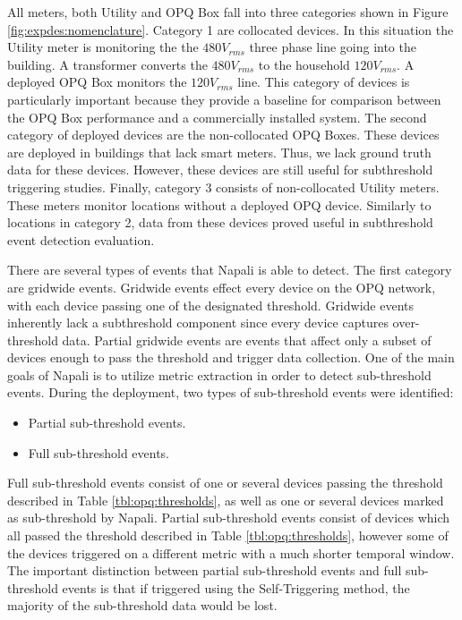 All meters, both Utility and OPQ Box fall into three categories shown in Figure \ref{fig:expdes:nomenclature}.
Category 1 are collocated devices.
In this situation the Utility meter is monitoring the the $480V_{rms}$ three phase line going into the building.
A transformer converts the $480V_{rms}$ to the household $120V_{rms}$.
A deployed OPQ Box monitors the $120V_{rms}$ line.
This category of devices is particularly important because they provide a baseline for comparison between the OPQ Box performance and a commercially installed system.
The second category of deployed devices are the non-collocated OPQ Boxes.
These devices are deployed in buildings that lack smart meters.
Thus, we lack ground truth data for these devices.
However, these devices are still useful for subthreshold triggering studies.
Finally, category 3 consists of non-collocated Utility meters.
These meters monitor locations without a deployed OPQ device.
Similarly to locations in category 2, data from these devices proved useful in subthreshold event detection evaluation.

There are several types of events that Napali is able to detect.
The first category are gridwide events.
Gridwide events effect every device on the OPQ network, with each device passing one of the designated threshold.
Gridwide events inherently lack a subthreshold component since every device captures over-threshold data.
Partial gridwide events are events that affect only a subset of devices enough to pass the threshold and trigger data collection.
One of the main goals of Napali is to utilize metric extraction in order to detect sub-threshold events.
During the deployment, two types of sub-threshold events were identified:
\begin{itemize}
    \item Partial sub-threshold events.
    \item Full sub-threshold events.
\end{itemize}
Full sub-threshold events consist of one or several devices passing the threshold described in Table \ref{tbl:opq:thresholds},
as well as one or several devices marked as sub-threshold by Napali.
Partial sub-threshold events consist of devices which all passed the threshold described in Table \ref{tbl:opq:thresholds}, however some of the devices triggered on a different metric with a much shorter temporal window.
The important distinction between partial sub-threshold events and full sub-threshold events is that if triggered using the Self-Triggering method, the majority of the sub-threshold data would be lost.

